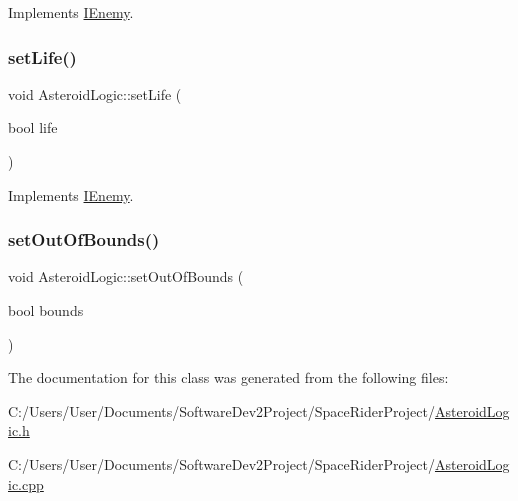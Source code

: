 Implements \hyperlink{class_i_enemy_acbc451cafee99cb405d9d9248820b6ea}{I\+Enemy}.

\mbox{\label{class_asteroid_logic_a594dc710574cac901e9999474b9379fe}} 
\subsubsection{\texorpdfstring{set\+Life()}{setLife()}}
{\footnotesize\ttfamily void Asteroid\+Logic\+::set\+Life (\begin{DoxyParamCaption}\item[{bool}]{life }\end{DoxyParamCaption})\hspace{0.3cm}{\ttfamily [virtual]}}



Implements \hyperlink{class_i_enemy_ab58f2f6c2a8c08730aaf8771f088e1bf}{I\+Enemy}.

\mbox{\label{class_asteroid_logic_ac9bfa7e9a3eed670f9264f15f395894e}} 
\subsubsection{\texorpdfstring{set\+Out\+Of\+Bounds()}{setOutOfBounds()}}
{\footnotesize\ttfamily void Asteroid\+Logic\+::set\+Out\+Of\+Bounds (\begin{DoxyParamCaption}\item[{bool}]{bounds }\end{DoxyParamCaption})}



The documentation for this class was generated from the following files\+:\begin{DoxyCompactItemize}
\item 
C\+:/\+Users/\+User/\+Documents/\+Software\+Dev2\+Project/\+Space\+Rider\+Project/\hyperlink{_asteroid_logic_8h}{Asteroid\+Logic.\+h}\item 
C\+:/\+Users/\+User/\+Documents/\+Software\+Dev2\+Project/\+Space\+Rider\+Project/\hyperlink{_asteroid_logic_8cpp}{Asteroid\+Logic.\+cpp}\end{DoxyCompactItemize}
